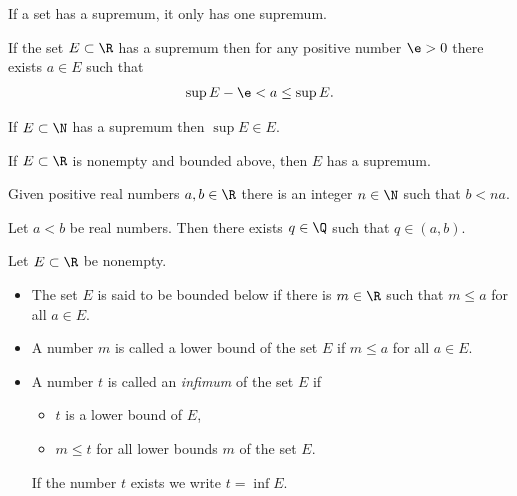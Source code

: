\documentclass{article}
\begin{document}
\setcounter{theorem}{3}
\begin{lemma}
    If a set has a supremum, it only has one supremum.
\end{lemma}

\begin{theorem}
    If the set $E\subset\R$ has a supremum then for any positive number $\e>0$ there exists $a\in E$
    such that
    \begin{align*}
        \sup E -\e < a \leq \sup E.
    \end{align*}
\end{theorem}

\begin{lemma}
    If $E\subset\N$ has a supremum then $\sup E\in E$.
\end{lemma}

\begin{definition*}
    If $E\subset\R$ is nonempty and bounded above, then $E$ has a supremum.
\end{definition*}

\begin{theorem}
    Given positive real numbers $a,b\in\R$ there is an integer $n\in\N$ such that $b<na$.
\end{theorem}

\setcounter{theorem}{8}
\begin{theorem}
    Let $a<b$ be real numbers. Then there exists $q\in\Q$ such that $q\in(a,b)$.
\end{theorem}

\begin{definition}
    Let $E\subset\R$ be nonempty.
    \begin{itemize}
        \item The set $E$ is said to be bounded below if there is $m\in\R$ such that $m\leq a$ for all $a\in E$.
        \item A number $m$ is called a lower bound of the set $E$ if $m\leq a$ for all $a\in E$.
        \item A number $t$ is called an \emph{infimum} of the set $E$ if \begin{itemize}
                  \item $t$ is a lower bound of $E$,
                  \item $m\leq t$ for all lower bounds $m$ of the set $E$.
              \end{itemize}
              If the number $t$ exists we write $t=\inf E$.
    \end{itemize}
\end{definition}
\end{document}
